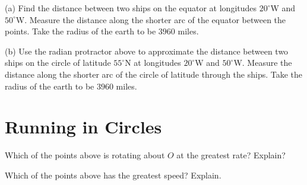 \documentclass{ximera}
\begin{document}
\begin{question}  \label{Q941F:Angles}
(a) Find the distance between two ships on the equator at longitudes $20^\circ$W and $50^\circ$W. Measure the distance along the shorter arc of the equator between the points. Take the radius of the earth to be $3960$ miles.

(b) Use the radian protractor above to approximate the distance between two ships on the circle of latitude $55^\circ$N at longitudes $20^\circ$W and $50^\circ$W. Measure the distance along the shorter arc of the circle of latitude through the ships.  Take the radius of the earth to be $3960$ miles.
\end{question}




\section{Running in Circles}
\begin{exploration}
 
\begin{onlineOnly}
    \begin{center}
\end{center}
\end{onlineOnly}


\begin{question} \label{Q72:Angles}
Which of the points above is rotating about $O$ at the greatest rate? Explain?
\begin{multipleChoice}  
\end{multipleChoice}  
\end{question}

\begin{question} \label{Q72:Angles}
Which of the points above has the greatest speed? Explain.
\begin{multipleChoice}  
\end{multipleChoice}  
\end{question}
\end{exploration}
\end{document}
